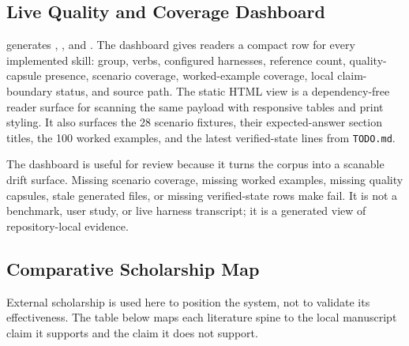\documentclass[
]{article}
\begin{document}
\subsection{Live Quality and Coverage
Dashboard}\label{live-quality-and-coverage-dashboard}

 generates
,
, and
. The dashboard gives
readers a compact row for every implemented skill: group, verbs,
configured harnesses, reference count, quality-capsule presence,
scenario coverage, worked-example coverage, local claim-boundary status,
and source path. The static HTML view is a dependency-free reader
surface for scanning the same payload with responsive tables and print
styling. It also surfaces the 28 scenario fixtures, their
expected-answer section titles, the 100 worked examples, and the latest
verified-state lines from \texttt{TODO.md}.

The dashboard is useful for review because it turns the corpus into a
scanable drift surface. Missing scenario coverage, missing worked
examples, missing quality capsules, stale generated files, or missing
verified-state rows make  fail. It is not a
benchmark, user study, or live harness transcript; it is a generated
view of repository-local evidence.

\subsection{Comparative Scholarship
Map}\label{comparative-scholarship-map}

External scholarship is used here to position the system, not to
validate its effectiveness. The table below maps each literature spine
to the local manuscript claim it supports and the claim it does not
support.
\end{document}
